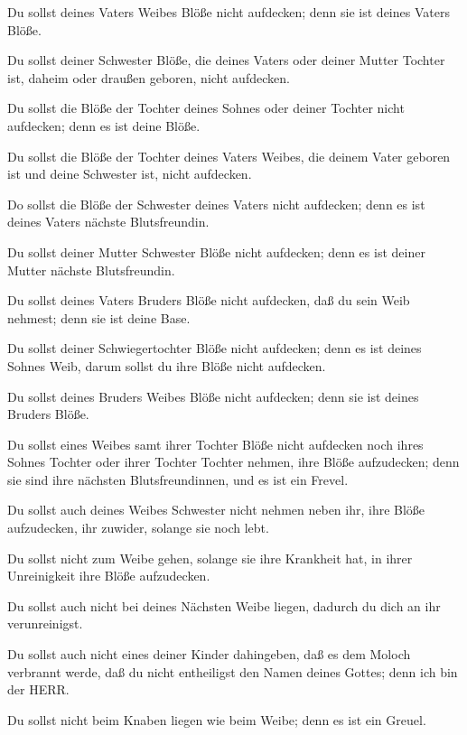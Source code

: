  Du sollst deines Vaters Weibes Blöße nicht aufdecken; denn
sie ist deines Vaters Blöße.

 Du sollst deiner Schwester Blöße, die deines Vaters oder
deiner Mutter Tochter ist, daheim oder draußen geboren, nicht aufdecken.

 Du sollst die Blöße der Tochter deines Sohnes oder deiner
Tochter nicht aufdecken; denn es ist deine Blöße.

 Du sollst die Blöße der Tochter deines Vaters Weibes, die
deinem Vater geboren ist und deine Schwester ist, nicht aufdecken.

 Do sollst die Blöße der Schwester deines Vaters nicht
aufdecken; denn es ist deines Vaters nächste Blutsfreundin.

 Du sollst deiner Mutter Schwester Blöße nicht aufdecken;
denn es ist deiner Mutter nächste Blutsfreundin.

 Du sollst deines Vaters Bruders Blöße nicht aufdecken, daß
du sein Weib nehmest; denn sie ist deine Base.

 Du sollst deiner Schwiegertochter Blöße nicht aufdecken;
denn es ist deines Sohnes Weib, darum sollst du ihre Blöße nicht
aufdecken.

 Du sollst deines Bruders Weibes Blöße nicht aufdecken;
denn sie ist deines Bruders Blöße.

 Du sollst eines Weibes samt ihrer Tochter Blöße nicht
aufdecken noch ihres Sohnes Tochter oder ihrer Tochter Tochter nehmen,
ihre Blöße aufzudecken; denn sie sind ihre nächsten Blutsfreundinnen,
und es ist ein Frevel.

 Du sollst auch deines Weibes Schwester nicht nehmen neben
ihr, ihre Blöße aufzudecken, ihr zuwider, solange sie noch lebt.

 Du sollst nicht zum Weibe gehen, solange sie ihre
Krankheit hat, in ihrer Unreinigkeit ihre Blöße aufzudecken.

 Du sollst auch nicht bei deines Nächsten Weibe liegen,
dadurch du dich an ihr verunreinigst.

 Du sollst auch nicht eines deiner Kinder dahingeben, daß
es dem Moloch verbrannt werde, daß du nicht entheiligst den Namen deines
Gottes; denn ich bin der HERR.

 Du sollst nicht beim Knaben liegen wie beim Weibe; denn es
ist ein Greuel.

